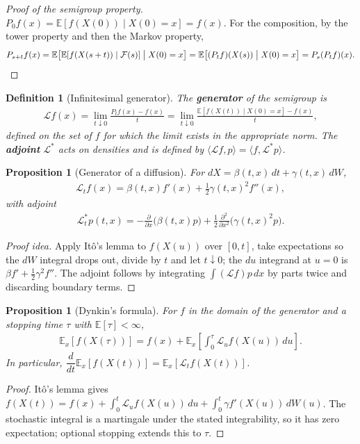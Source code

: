 \documentclass{report}
\theoremstyle{spacedplain}
\newtheorem{proposition}[theorem]{Proposition}
\theoremstyle{spaceddefinition}
\newtheorem{definition}[theorem]{Definition}
\theoremstyle{spacedremark}
\begin{document}
\begin{proof}[Proof of the semigroup property]
$P_0f(x) = \mathbb{E}[f(X(0))\mid X(0)=x] = f(x)$. For the composition, by the tower property and then the Markov property,
\begin{align}
    P_{s+t}f(x) = \mathbb{E}\bigl[\mathbb{E}[f(X(s+t))\mid \mathcal{F}(s)]\bigm| X(0)=x\bigr] = \mathbb{E}\bigl[(P_tf)(X(s))\bigm| X(0)=x\bigr] = P_s(P_tf)(x).
\end{align}
\end{proof}

\begin{definition}[Infinitesimal generator]
The \textbf{generator} of the semigroup is
\begin{align}
    \mathcal{L}f(x) = \lim_{t\downarrow 0}\frac{P_tf(x)-f(x)}{t} = \lim_{t\downarrow 0}\frac{\mathbb{E}[f(X(t))\mid X(0)=x]-f(x)}{t},
\end{align}
defined on the set of $f$ for which the limit exists in the appropriate norm. The \textbf{adjoint} $\mathcal{L}^*$ acts on densities and is defined by $\langle\mathcal{L}f,p\rangle = \langle f,\mathcal{L}^*p\rangle$.
\end{definition}

\begin{proposition}[Generator of a diffusion]
For $dX = \beta(t,x)\,dt+\gamma(t,x)\,dW$,
\begin{align}
    \mathcal{L}_t f(x) = \beta(t,x)f'(x) + \tfrac12\gamma(t,x)^2f''(x),
\end{align}
with adjoint
\begin{align}
    \mathcal{L}^*_t p(t,x) = -\frac{\partial}{\partial x}\bigl(\beta(t,x)p\bigr) + \frac12\frac{\partial^2}{\partial x^2}\bigl(\gamma(t,x)^2 p\bigr).
\end{align}
\end{proposition}
\begin{proof}[Proof idea]
Apply It\^o's lemma to $f(X(u))$ over $[0,t]$, take expectations so the $dW$ integral drops out, divide by $t$ and let $t\downarrow 0$; the $du$ integrand at $u=0$ is $\beta f' + \tfrac12\gamma^2f''$. The adjoint follows by integrating $\int(\mathcal{L}f)p\,dx$ by parts twice and discarding boundary terms.
\end{proof}

\begin{proposition}[Dynkin's formula]\label{prop:dynkin}
For $f$ in the domain of the generator and a stopping time $\tau$ with $\mathbb{E}[\tau]<\infty$,
\begin{align}
    \mathbb{E}_x\!\left[f(X(\tau))\right] = f(x) + \mathbb{E}_x\!\left[\int_0^{\tau}\mathcal{L}_u f(X(u))\,du\right].
\end{align}
In particular, $\dfrac{d}{dt}\mathbb{E}_x[f(X(t))] = \mathbb{E}_x[\mathcal{L}_tf(X(t))]$.
\end{proposition}
\begin{proof}
It\^o's lemma gives $f(X(t)) = f(x) + \int_0^t \mathcal{L}_uf(X(u))\,du + \int_0^t \gamma f'(X(u))\,dW(u)$. The stochastic integral is a martingale under the stated integrability, so it has zero expectation; optional stopping extends this to $\tau$.
\end{proof}
\end{document}
